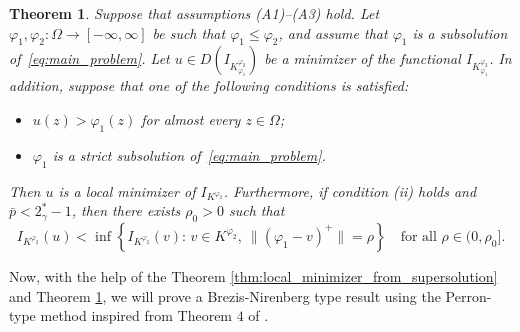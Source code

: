 \documentclass[11pt]{article}
\newtheorem{theorem}{Theorem}[section] %
\begin{document}
\begin{theorem}
\label{thm:dual_local_minimizer}
Suppose that assumptions \textnormal{(A1)}--\textnormal{(A3)} hold. Let $\varphi_1,\varphi_2:\Omega \to [-\infty,\infty]$ be such that $\varphi_1 \leq \varphi_2$, and assume that $\varphi_1$ is a subsolution of~\eqref{eq:main_problem}. Let $u \in D(I_{K_{\varphi_1}^{\varphi_2}})$ be a minimizer of the functional $I_{K_{\varphi_1}^{\varphi_2}}$. In addition, suppose that one of the following conditions is satisfied:
\begin{itemize}
    \item[(i)] $u(z) > \varphi_1(z)$ for almost every $z \in \Omega$;
    \item[(ii)] $\varphi_1$ is a strict subsolution of~\eqref{eq:main_problem}.
\end{itemize}
Then $u$ is a local minimizer of $I_{K^{\varphi_2}}$. Furthermore, if condition \textnormal{(ii)} holds and $\bar p < 2_{\gamma}^{\ast}-1$, then there exists $\rho_0>0$ such that
\begin{equation*}
I_{K^{\varphi_2}}(u)
<
\inf \left\{
I_{K^{\varphi_2}}(v):\, v \in K^{\varphi_2},\ 
\bigl\|(\varphi_1-v)^{+}\bigr\|=\rho
\right\}
\quad \text{for all } \rho \in (0,\rho_0].
\end{equation*}
\end{theorem}


Now, with the help of the Theorem \ref{thm:local_minimizer_from_supersolution} and Theorem \ref{thm:dual_local_minimizer}, we will prove a Brezis-Nirenberg type result using the Perron-type method inspired from Theorem $4$ of \cite{hirano_concave_convex}.
\end{document}
